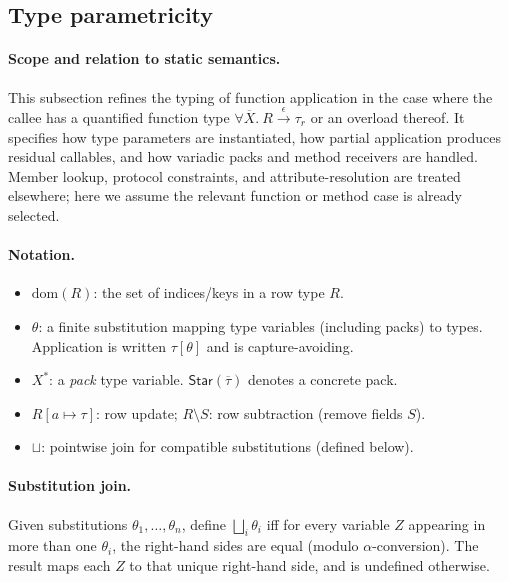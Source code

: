 \subsection{Type parametricity}
\label{appendix:type-parametricity}

\paragraph{Scope and relation to static semantics.}
This subsection refines the typing of function application in the case where the callee
has a quantified function type $\forall\overline{X}.~R \xrightarrow{\epsilon} \tau_r$ or
an overload thereof. It specifies how type parameters are instantiated, how partial
application produces residual callables, and how variadic packs and method receivers
are handled. Member lookup, protocol constraints, and attribute-resolution are treated
elsewhere; here we assume the relevant function or method case is already selected.

\paragraph{Notation.}
\begin{itemize}
  \item $\mathrm{dom}(R)$: the set of indices/keys in a row type $R$.
  \item $\theta$: a finite substitution mapping type variables (including packs) to types.
        Application is written $\tau[\theta]$ and is capture-avoiding.
  \item $X^*$: a \emph{pack} type variable. $\mathsf{Star}(\overline{\tau})$ denotes a concrete pack.
  \item $R[a \mapsto \tau]$: row update; $R \setminus S$: row subtraction (remove fields $S$).
  \item $\sqcup$: pointwise join for compatible substitutions (defined below).
\end{itemize}

\paragraph{Substitution join.}
Given substitutions $\theta_1,\ldots,\theta_n$, define
$\bigsqcup_i \theta_i$ iff for every variable $Z$ appearing in more than one $\theta_i$,
the right-hand sides are equal (modulo $\alpha$-conversion). The result maps each $Z$
to that unique right-hand side, and is undefined otherwise.

